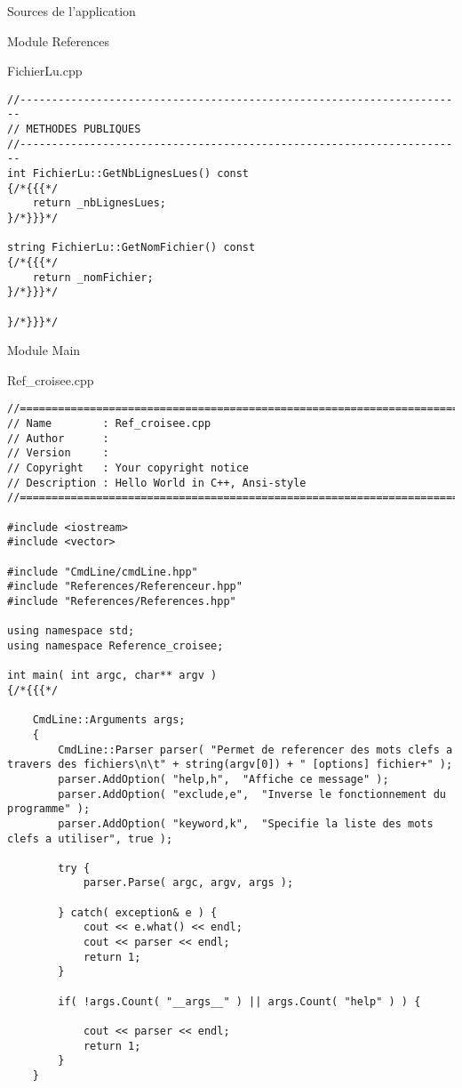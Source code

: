 \documentclass{article}
\begin{document}
\begin{section}{Sources de l'application}
\begin{subsection}{Module References}
\begin{paragraph}{FichierLu.cpp}
\begin{verbatim}
//----------------------------------------------------------------------
// METHODES PUBLIQUES
//----------------------------------------------------------------------
int FichierLu::GetNbLignesLues() const
{/*{{{*/
    return _nbLignesLues;
}/*}}}*/

string FichierLu::GetNomFichier() const
{/*{{{*/
    return _nomFichier;
}/*}}}*/

}/*}}}*/
  \end{verbatim}
  \end{paragraph}


\end{subsection}


  \newpage
  \begin{subsection}{Module Main}
   
  \begin{paragraph}{Ref\_croisee.cpp}
   \begin{verbatim}//============================================================================
// Name        : Ref_croisee.cpp
// Author      :
// Version     :
// Copyright   : Your copyright notice
// Description : Hello World in C++, Ansi-style
//============================================================================

#include <iostream>
#include <vector>

#include "CmdLine/cmdLine.hpp"
#include "References/Referenceur.hpp"
#include "References/References.hpp"

using namespace std;
using namespace Reference_croisee;

int main( int argc, char** argv )
{/*{{{*/

    CmdLine::Arguments args;
    {
        CmdLine::Parser parser( "Permet de referencer des mots clefs a travers des fichiers\n\t" + string(argv[0]) + " [options] fichier+" );
        parser.AddOption( "help,h",  "Affiche ce message" );
        parser.AddOption( "exclude,e",  "Inverse le fonctionnement du programme" );
        parser.AddOption( "keyword,k",  "Specifie la liste des mots clefs a utiliser", true );

        try {
            parser.Parse( argc, argv, args );

        } catch( exception& e ) {
            cout << e.what() << endl;
            cout << parser << endl;
            return 1;
        }

        if( !args.Count( "__args__" ) || args.Count( "help" ) ) {

            cout << parser << endl;
            return 1;
        }
    }


\end{verbatim}
\end{paragraph}
\end{subsection}
\end{section}
\end{document}
